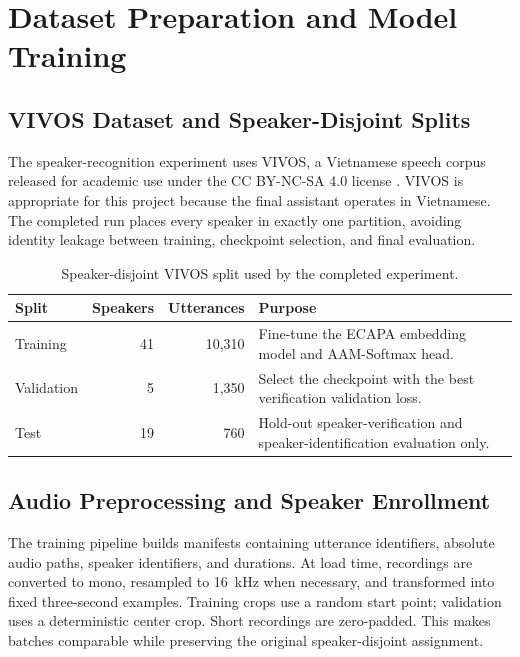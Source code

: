 \section{Dataset Preparation and Model Training}

\subsection{VIVOS Dataset and Speaker-Disjoint Splits}
The speaker-recognition experiment uses VIVOS, a Vietnamese speech corpus released for academic use under the CC BY-NC-SA 4.0 license \cite{vivos}. VIVOS is appropriate for this project because the final assistant operates in Vietnamese. The completed run places every speaker in exactly one partition, avoiding identity leakage between training, checkpoint selection, and final evaluation.

\begin{table}[H]
\centering
\begin{tabularx}{\textwidth}{lrrX}
\toprule
\textbf{Split} & \textbf{Speakers} & \textbf{Utterances} & \textbf{Purpose} \\
\midrule
Training & 41 & 10,310 & Fine-tune the ECAPA embedding model and AAM-Softmax head. \\
Validation & 5 & 1,350 & Select the checkpoint with the best verification validation loss. \\
Test & 19 & 760 & Hold-out speaker-verification and speaker-identification evaluation only. \\
\bottomrule
\end{tabularx}
\caption{Speaker-disjoint VIVOS split used by the completed experiment.}
\label{tab:vivos-split}
\end{table}

\subsection{Audio Preprocessing and Speaker Enrollment}
The training pipeline builds manifests containing utterance identifiers, absolute audio paths, speaker identifiers, and durations. At load time, recordings are converted to mono, resampled to 16~kHz when necessary, and transformed into fixed three-second examples. Training crops use a random start point; validation uses a deterministic center crop. Short recordings are zero-padded. This makes batches comparable while preserving the original speaker-disjoint assignment.

